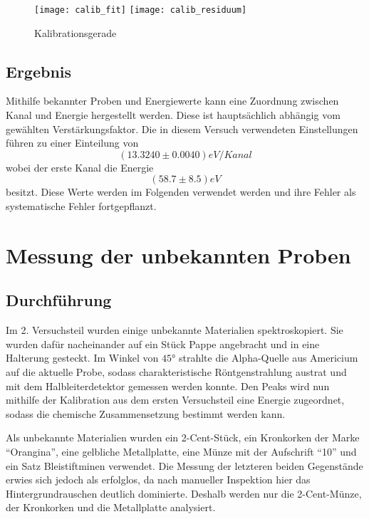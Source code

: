 \documentclass{../Misc/MontavonLaTeX/Montavon}
\newcommand{\halfwidth}{0.48\textwidth}
\begin{document}
\begin{figure}[h]
\centering
\texttt{[image: calib\_fit]}
\texttt{[image: calib\_residuum]}
\caption{Kalibrationsgerade}
\label{fig:Kalibrationsgerade}
\end{figure}

%

\subsection{Ergebnis}
Mithilfe bekannter Proben und Energiewerte kann eine Zuordnung zwischen Kanal und Energie hergestellt werden. Diese ist hauptsächlich abhängig vom gewählten Verstärkungsfaktor. 
Die in diesem Versuch verwendeten Einstellungen führen zu einer Einteilung von 
\[ (13.3240 \pm 0.0040) \unit{eV/Kanal} \]
wobei der erste Kanal die Energie 
\[ (58.7 \pm 8.5) \unit{eV} \] 
besitzt. Diese Werte werden im Folgenden verwendet werden und ihre Fehler als systematische Fehler fortgepflanzt.

\section{Messung der unbekannten Proben}
\subsection{Durchführung}
Im 2. Versuchsteil wurden einige unbekannte Materialien spektroskopiert. Sie wurden dafür nacheinander auf ein Stück Pappe angebracht und in eine Halterung gesteckt. Im Winkel von $45 \unit{\degree}$ strahlte die Alpha-Quelle aus Americium auf die aktuelle Probe, sodass charakteristische Röntgenstrahlung austrat und mit dem Halbleiterdetektor gemessen werden konnte.
Den Peaks wird nun mithilfe der Kalibration aus dem ersten Versuchsteil eine Energie zugeordnet, sodass die chemische Zusammensetzung bestimmt werden kann.

Als unbekannte Materialien wurden ein 2-Cent-Stück, ein Kronkorken der Marke \enquote{Orangina}, eine gelbliche Metallplatte, eine Münze mit der Aufschrift \enquote{10} und ein Satz Bleistiftminen verwendet.
Die Messung der letzteren beiden Gegenstände erwies sich jedoch als erfolglos, da nach manueller Inspektion hier das Hintergrundrauschen deutlich dominierte. 
Deshalb werden nur die 2-Cent-Münze, der Kronkorken und die Metallplatte analysiert.
\end{document}
